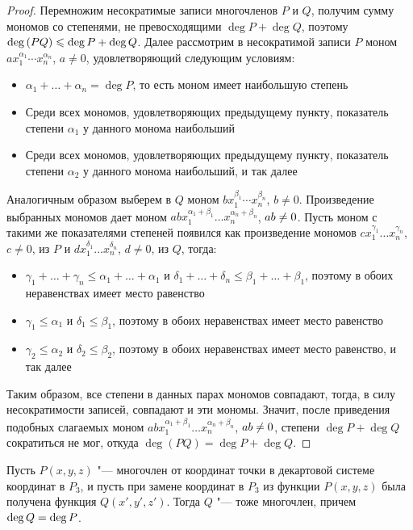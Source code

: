 \begin{proof}
	Перемножим несократимые записи многочленов $P$ и $Q$, получим сумму мономов со степенями, не превосходящими $\deg{P} + \deg{Q}$, поэтому $\deg{(PQ)} \hm{\le} \deg{P} + \deg{Q}$. Далее рассмотрим в несократимой записи $P$ моном $ax_1^{\alpha_1}\dotsm x_n^{\alpha_n}$, $a \ne 0$, удовлетворяющий следующим условиям:
	\begin{itemize}
		\item $\alpha_1 + \dots + \alpha_n = \deg{P}$, то есть моном имеет наибольшую степень
		\item Среди всех мономов, удовлетворяющих предыдущему пункту, показатель степени $\alpha_1$ у данного монома наибольший
		\item Среди всех мономов, удовлетворяющих предыдущему пункту, показатель степени $\alpha_2$ у данного монома наибольший, и так далее
	\end{itemize}
	
	Аналогичным образом выберем в $Q$ моном $bx_1^{\beta_1}\dotsm x_n^{\beta_n}$, $b \ne 0$. Произведение выбранных мономов дает моном $abx_1^{\alpha_1+\beta_1}\dots x_n^{\alpha_n+\beta_n}$, $ab \hm{\ne} 0$. Пусть моном с такими же показателями степеней появился как произведение мономов $cx_1^{\gamma_1}\dots x_n^{\gamma_n}$, $c \ne 0$, из $P$ и $dx_1^{\delta_1}\dots x_n^{\delta_n}$, $d \ne 0$, из $Q$, тогда:
	\begin{itemize}
		\item $\gamma_1 + \dots + \gamma_n \le \alpha_1 + \dots + \alpha_1$ и $\delta_1 + \dots + \delta_n \le \beta_1 + \dots + \beta_1$, поэтому в обоих неравенствах имеет место равенство
		\item $\gamma_1 \le \alpha_1$ и $\delta_1 \le \beta_1$, поэтому в обоих неравенствах имеет место равенство
		\item $\gamma_2 \le \alpha_2$ и $\delta_2 \le \beta_2$, поэтому в обоих неравенствах имеет место равенство, и так далее
	\end{itemize}
	
	Таким образом, все степени в данных парах мономов совпадают, тогда, в силу несократимости записей, совпадают и эти мономы. Значит, после приведения подобных слагаемых моном $abx_1^{\alpha_1+\beta_1}\dots x_n^{\alpha_n+\beta_n}$, $ab \hm{\ne} 0$, степени $\deg{P} + \deg{Q}$ сократиться не мог, откуда $\deg{(PQ)} = \deg{P} + \deg{Q}$.
\end{proof}

\begin{theorem}
	Пусть $P(x, y, z)$ "--- многочлен от координат точки в декартовой системе координат в $P_3$, и пусть при замене координат в $P_3$ из функции $P(x, y, z)$ была получена функция $Q(x', y', z')$. Тогда $Q$ "--- тоже многочлен, причем $\deg{Q} \hm{=} \deg{P}$.
\end{theorem}

